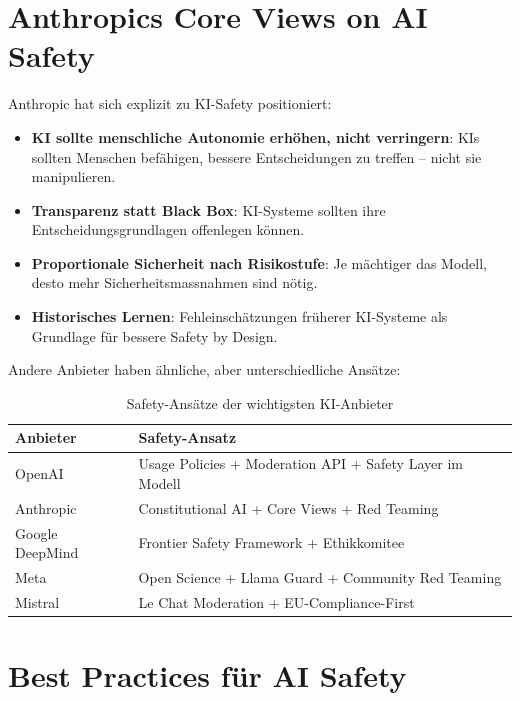 \section{Anthropics Core Views on AI Safety}

Anthropic hat sich explizit zu KI-Safety positioniert:

\begin{itemize}[leftmargin=*]
    \item \textbf{KI sollte menschliche Autonomie erhöhen, nicht verringern}: KIs sollten Menschen befähigen, bessere Entscheidungen zu treffen -- nicht sie manipulieren.
    \item \textbf{Transparenz statt Black Box}: KI-Systeme sollten ihre Entscheidungsgrundlagen offenlegen können.
    \item \textbf{Proportionale Sicherheit nach Risikostufe}: Je mächtiger das Modell, desto mehr Sicherheitsmassnahmen sind nötig.
    \item \textbf{Historisches Lernen}: Fehleinschätzungen früherer KI-Systeme als Grundlage für bessere Safety by Design.
\end{itemize}

Andere Anbieter haben ähnliche, aber unterschiedliche Ansätze:

\begin{table}[H]
\centering
\begin{tabularx}{\linewidth}{lX}
\toprule
\textbf{Anbieter} & \textbf{Safety-Ansatz} \\
\midrule
OpenAI & Usage Policies + Moderation API + Safety Layer im Modell \\
Anthropic & Constitutional AI + Core Views + Red Teaming \\
Google DeepMind & Frontier Safety Framework + Ethikkomitee \\
Meta & Open Science + Llama Guard + Community Red Teaming \\
Mistral & Le Chat Moderation + EU-Compliance-First \\
\bottomrule
\end{tabularx}
\caption{Safety-Ansätze der wichtigsten KI-Anbieter}
\end{table}

\section{Best Practices für AI Safety}

